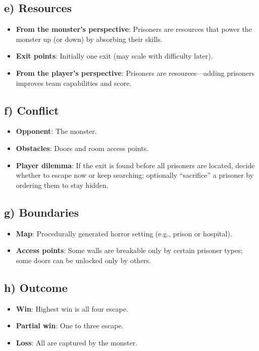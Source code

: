 \documentclass[11pt]{article}
\begin{document}
\subsection*{e) Resources}
\begin{itemize}
  \item \textbf{From the monster's perspective}: Prisoners are resources that power the monster up (or down) by absorbing their skills.
  \item \textbf{Exit points}: Initially one exit (may scale with difficulty later).
  \item \textbf{From the player's perspective}: Prisoners are resources---adding prisoners improves team capabilities and score.
\end{itemize}

\subsection*{f) Conflict}
\begin{itemize}
  \item \textbf{Opponent}: The monster.
  \item \textbf{Obstacles}: Doors and room access points.
  \item \textbf{Player dilemma}: If the exit is found before all prisoners are located, decide whether to escape now or keep searching; optionally ``sacrifice'' a prisoner by ordering them to stay hidden.
\end{itemize}

\subsection*{g) Boundaries}
\begin{itemize}
  \item \textbf{Map}: Procedurally generated horror setting (e.g., prison or hospital).
  \item \textbf{Access points}: Some walls are breakable only by certain prisoner types; some doors can be unlocked only by others.
\end{itemize}

\subsection*{h) Outcome}
\begin{itemize}
  \item \textbf{Win}: Highest win is all four escape.
  \item \textbf{Partial win}: One to three escape.
  \item \textbf{Loss}: All are captured by the monster.
\end{itemize}
\end{document}
